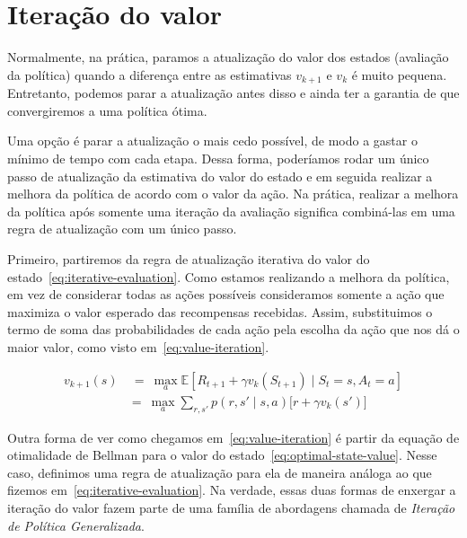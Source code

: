 \documentclass{article}
\begin{document}
    \section{Iteração do valor}

        Normalmente, na prática, paramos a atualização do valor dos estados (avaliação da política) quando a diferença entre as estimativas $v_{k+1}$ e $v_k$ é muito pequena. Entretanto, podemos parar a atualização antes disso e ainda ter a garantia de que convergiremos a uma política ótima.

        Uma opção é parar a atualização o mais cedo possível, de modo a gastar o mínimo de tempo com cada etapa. Dessa forma, poderíamos rodar um único passo de atualização da estimativa do valor do estado e em seguida realizar a melhora da política de acordo com o valor da ação. Na prática, realizar a melhora da política após somente uma iteração da avaliação significa combiná-las em uma regra de atualização com um único passo.

        Primeiro, partiremos da regra de atualização iterativa do valor do estado~\eqref{eq:iterative-evaluation}. Como estamos realizando a melhora da política, em vez de considerar todas as ações possíveis consideramos somente a ação que maximiza o valor esperado das recompensas recebidas. Assim, substituimos o termo de soma das probabilidades de cada ação pela escolha da ação que nos dá o maior valor, como visto em~\eqref{eq:value-iteration}.
        
        \begin{equation}
            \begin{aligned}
                v_{k+1}(s) & \ = \ \max_a \mathbb{E}[R_{t+1} + \gamma v_k(S_{t+1}) \mid S_t = s, A_t = a] \\
                & = \ \max_a \sum_{r, s'} p(r, s' \mid s, a) \Big[ r + \gamma v_k(s') \Big]
            \end{aligned}
            \label{eq:value-iteration}
        \end{equation}
        
        Outra forma de ver como chegamos em~\eqref{eq:value-iteration} é partir da equação de otimalidade de Bellman para o valor do estado~\eqref{eq:optimal-state-value}. Nesse caso, definimos uma regra de atualização para ela de maneira análoga ao que fizemos em~\eqref{eq:iterative-evaluation}. Na verdade, essas duas formas de enxergar a iteração do valor fazem parte de uma família de abordagens chamada de \emph{Iteração de Política Generalizada}.
    
\end{document}
